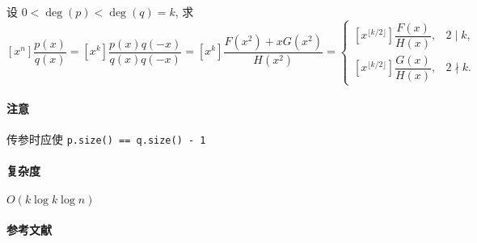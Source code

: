 设 \(0<\deg(p)<\deg(q)=k\), 求 \(\displaystyle\left[x^n\right]\dfrac{p(x)}{q(x)}=\left[x^k\right]\dfrac{p(x)q(-x)}{q(x)q(-x)}=\left[x^k\right]\dfrac{F\left(x^2\right)+xG\left(x^2\right)}{H\left(x^2\right)}=\begin{cases}
    \left[x^{\lfloor k/2\rfloor}\right]\dfrac{F(x)}{H(x)}, & 2\mid k,  \\
    \left[x^{\lfloor k/2\rfloor}\right]\dfrac{G(x)}{H(x)}, & 2\nmid k.
\end{cases}\)

\paragraph{注意}

传参时应使 \verb|p.size() == q.size() - 1|

\paragraph{复杂度}

\(O(k\log k\log n)\)

\paragraph{参考文献} \cite{bostan2021simple}
